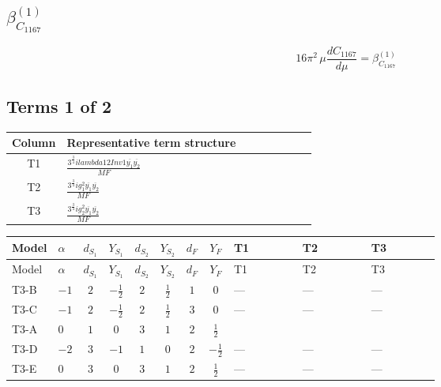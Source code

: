 \documentclass[8pt]{article}
\begin{document}
\begin{landscape}
\section*{$\beta_{C_{1167}}^{(1)}$}
\[16\pi^2\,\mu\frac{d C_{1167}}{d\mu}=\beta_{C_{1167}}^{(1)}\]
\subsection*{Terms 1 of 2}
\begin{center}
\begin{tabular}{@{}c >{\raggedright\arraybackslash}p{0.82\linewidth}@{}}
\toprule
Column & Representative term structure \\
\midrule
T1 & \(\displaystyle \frac{3^{\frac{3}{4}} i lambda12Inv1 \overline{y_{1}} \overline{y_{2}}}{MF}\) \\
\midrule
T2 & \(\displaystyle \frac{3^{\frac{3}{4}} i g_{1}^{2} \overline{y_{1}} \overline{y_{2}}}{MF}\) \\
\midrule
T3 & \(\displaystyle \frac{3^{\frac{3}{4}} i g_{2}^{2} \overline{y_{1}} \overline{y_{2}}}{MF}\) \\
\midrule
\bottomrule
\end{tabular}
\end{center}
\smallskip
\tiny
\begin{longtable}{@{}llcccccc >{\raggedright\arraybackslash}p{0.21\linewidth} >{\raggedright\arraybackslash}p{0.21\linewidth} >{\raggedright\arraybackslash}p{0.21\linewidth}@{}}
\toprule
Model & $\alpha$ & $d_{S_1}$ & $Y_{S_1}$ & $d_{S_2}$ & $Y_{S_2}$ & $d_F$ & $Y_F$ & T1 & T2 & T3 \\
\midrule
\endfirsthead
\toprule
Model & $\alpha$ & $d_{S_1}$ & $Y_{S_1}$ & $d_{S_2}$ & $Y_{S_2}$ & $d_F$ & $Y_F$ & T1 & T2 & T3 \\
\midrule
\endhead
T3-B & $-1$ & $2$ & $-\frac{1}{2}$ & $2$ & $\frac{1}{2}$ & $1$ & $0$ & --- & --- & --- \\
\midrule
T3-C & $-1$ & $2$ & $-\frac{1}{2}$ & $2$ & $\frac{1}{2}$ & $3$ & $0$ & --- & --- & --- \\
\midrule
T3-A & $0$ & $1$ & $0$ & $3$ & $1$ & $2$ & $\frac{1}{2}$ & \scriptsize\adjustbox{max width=\linewidth}{$\begin{gathered} \frac{3^{\frac{3}{4}} i lambda12Inv1 \overline{y_{1}} \overline{y_{2}}}{6 MF}\end{gathered}$} & \scriptsize\adjustbox{max width=\linewidth}{$\begin{gathered} \frac{3^{\frac{3}{4}} i g_{1}^{2} \overline{y_{1}} \overline{y_{2}}}{8 MF}\end{gathered}$} & \scriptsize\adjustbox{max width=\linewidth}{$\begin{gathered} \frac{11 \cdot 3^{\frac{3}{4}} i g_{2}^{2} \overline{y_{1}} \overline{y_{2}}}{8 MF}\end{gathered}$} \\
\midrule
T3-D & $-2$ & $3$ & $-1$ & $1$ & $0$ & $2$ & $-\frac{1}{2}$ & --- & --- & --- \\
\midrule
T3-E & $0$ & $3$ & $0$ & $3$ & $1$ & $2$ & $\frac{1}{2}$ & --- & --- & --- \\
\midrule
\bottomrule
\end{longtable}
\clearpage

\end{landscape}
\end{document}
